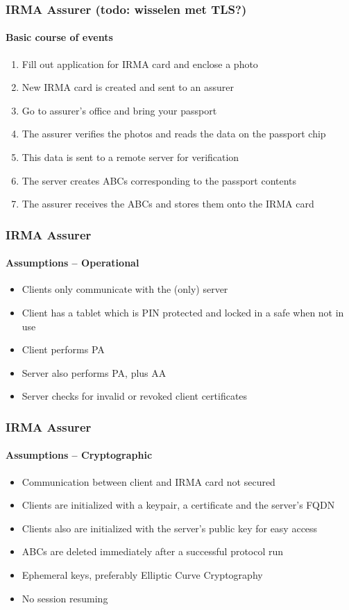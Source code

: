 \documentclass[hyperref={urlcolor=black, citecolor=black, pdfpagemode=UseNone, pdfpagelayout=SinglePage, pdfstartview=}]{beamer}
\begin{document}
\begin{frame}
  \frametitle{IRMA Assurer (todo: wisselen met TLS?)}
  \framesubtitle{Basic course of events}
  
  \begin{enumerate}
    \item<1-> Fill out application for IRMA card and enclose a photo
    \item<2-> New IRMA card is created and sent to an assurer
    \item<3-> Go to assurer's office and bring your passport
    \item<4-> The assurer verifies the photos and reads the data on the passport chip
    \item<5-> This data is sent to a remote server for verification
    \item<6-> The server creates ABCs corresponding to the passport contents
    \item<7-> The assurer receives the ABCs and stores them onto the IRMA card
  \end{enumerate}
\end{frame}

\begin{frame}
  \frametitle{IRMA Assurer}
  \framesubtitle{Assumptions -- Operational}
  \begin{itemize}
    \item Clients only communicate with the (only) server
    \item Client has a tablet which is PIN protected and locked in a safe when not in use
    \item Client performs PA
    \item Server also performs PA, plus AA
    \item Server checks for invalid or revoked client certificates    
  \end{itemize}
\end{frame}

\begin{frame}
  \frametitle{IRMA Assurer}
  \framesubtitle{Assumptions -- Cryptographic}
  \begin{itemize}
    \item Communication between client and IRMA card not secured
    \item Clients are initialized with a keypair, a certificate and the server's FQDN
    \item Clients also are initialized with the server's public key for easy access
    \item ABCs are deleted immediately after a successful protocol run
    \item Ephemeral keys, preferably Elliptic Curve Cryptography
    \item No session resuming
  \end{itemize}
\end{frame}
\end{document}
